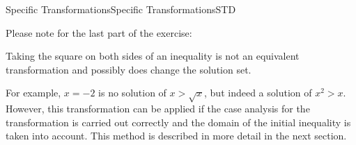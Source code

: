 \begin{MXContent}{Specific Transformations}{Specific Transformations}{STD}
\begin{MExercise}
\end{MExercise}

Please note for the last part of the exercise:

\begin{MInfo}
Taking the square on both sides of an inequality is not an equivalent transformation and 
possibly does change the solution set.
\end{MInfo}

For example, $x=-2$ is no solution of $x>\sqrt{x}$, but indeed a solution of $x^2>x$. However,
this transformation can be applied if the case analysis for the transformation
is carried out correctly and the domain of the initial inequality is taken into account. This method is
described in more detail in the next section.
\end{MXContent}


